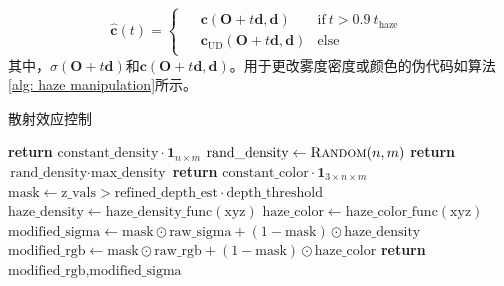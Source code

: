 \begin{appendices}
\begin{equation}
    \hat{\mathbf{c}} (t) =
        \begin{cases}
            \begin{aligned}
                &\mathbf{c}(\mathbf{O}+t\mathbf{d}, \mathbf{d})\: &\text{if}\: t > 0.9 \:  t_\text{haze} \\
                &\mathbf{c}_{\text{UD}}(\mathbf{O}+t\mathbf{d}, \mathbf{d})&\text{else}
            \end{aligned}
        \end{cases}
\end{equation}
其中，$\sigma(\mathbf{O}+t\mathbf{d})$和$\mathbf{c}(\mathbf{O}+t\mathbf{d}, \mathbf{d})$。用于更改雾度密度或颜色的伪代码如算法\ref{alg: haze manipulation}所示。


\begin{algorithm*}[t]
\caption{散射效应控制}
\label{alg: haze manipulation}
\begin{algorithmic}[1]
    \State \textbf{return} $\text{constant\_density} \cdot \mathbf{1}_{n \times m}$
\EndProcedure
{}
    \State $\text{rand\_density} \gets \Call{Random}{n, m}$
    \State \textbf{return} $\text{rand\_density} \cdot \text{max\_density}$
\EndProcedure
{}
    \State \textbf{return} $\text{constant\_color} \cdot \mathbf{1}_{3 \times n \times m}$
\EndProcedure
{}
    \State $\text{mask} \gets \text{z\_vals} > \text{refined\_depth\_est} \cdot \text{depth\_threshold}$
    \State $\text{haze\_density} \gets \text{haze\_density\_func}(\text{xyz})$
    \State $\text{haze\_color} \gets \text{haze\_color\_func}(\text{xyz})$
    \State $\text{modified\_sigma} \gets \text{mask} \odot \text{raw\_sigma} + (1 - \text{mask}) \odot \text{haze\_density}$
    \State $\text{modified\_rgb} \gets \text{mask} \odot \text{raw\_rgb} + (1 - \text{mask}) \odot \text{haze\_color}$
    \State \textbf{return} $\text{modified\_rgb}, \text{modified\_sigma}$
\EndProcedure
\end{algorithmic}
\end{algorithm*}

\end{appendices}

